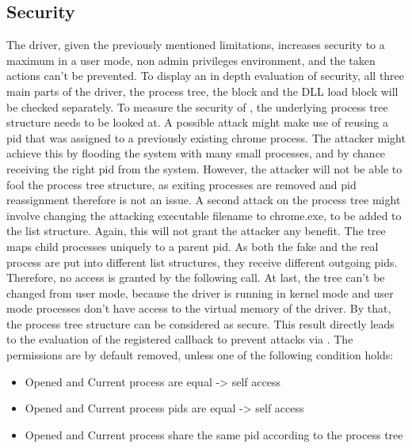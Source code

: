 \subsection{Security}
The driver, given the previously mentioned limitations, increases security to a maximum in a user mode, non admin privileges environment, and the taken actions can't be prevented. To display an in depth evaluation of security, all three main parts of the driver, the process tree, the  block and the DLL load block will be checked separately.
To measure the security of , the underlying process tree structure needs to be looked at. A possible attack might make use of reusing a pid that was assigned to a previously existing chrome process. The attacker might achieve this by flooding the system with many small processes, and by chance receiving the right pid from the system. However, the attacker will not be able to fool the process tree structure, as exiting processes are removed and pid reassignment therefore is not an issue. A second attack on the process tree might involve changing the attacking executable filename to chrome.exe, to be added to the list structure. Again, this will not grant the attacker any benefit. The tree maps child processes uniquely to a parent pid. As both the fake and the real process are put into different list structures, they receive different outgoing pids. Therefore, no access is granted by the following  call. At last, the tree can't be changed from user mode, because the driver is running in kernel mode and user mode processes don't have access to the virtual memory of the driver. By that, the process tree structure can be considered as secure. This result directly leads to the evaluation of the registered callback to prevent attacks via . The permissions are by default removed, unless one of the following condition holds:
\begin{itemize}
\item Opened and Current process are equal -> self access
\item Opened and Current process pids are equal -> self access
\item Opened and Current process share the same pid according to the process tree
\end{itemize}
